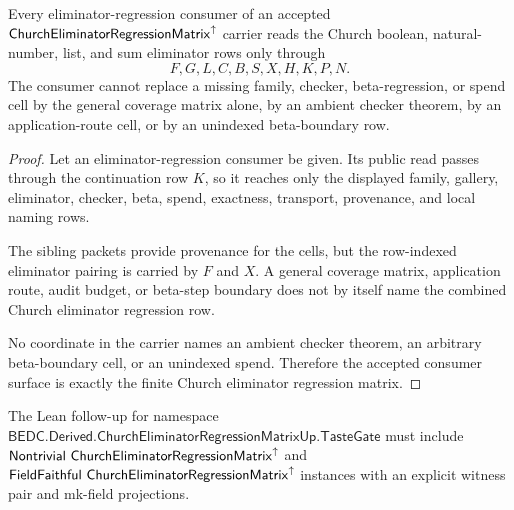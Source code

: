 \begin{theorem}
\label{thm:church-eliminator-regression-matrix-nonescape}
Every eliminator-regression consumer of an accepted $\mathsf{ChurchEliminatorRegressionMatrix}^{\uparrow}$ carrier reads the Church boolean, natural-number, list, and sum eliminator rows only through
$$
F,G,L,C,B,S,X,H,K,P,N.
$$
The consumer cannot replace a missing family, checker, beta-regression, or spend cell by the general coverage matrix alone, by an ambient checker theorem, by an application-route cell, or by an unindexed beta-boundary row.
\end{theorem}
\begin{proof}
Let an eliminator-regression consumer be given. Its public read passes through the continuation row $K$, so it reaches only the displayed family, gallery, eliminator, checker, beta, spend, exactness, transport, provenance, and local naming rows.

The sibling packets provide provenance for the cells, but the row-indexed eliminator pairing is carried by $F$ and $X$. A general coverage matrix, application route, audit budget, or beta-step boundary does not by itself name the combined Church eliminator regression row.

No coordinate in the carrier names an ambient checker theorem, an arbitrary beta-boundary cell, or an unindexed spend. Therefore the accepted consumer surface is exactly the finite Church eliminator regression matrix.
\end{proof}



The Lean follow-up for namespace $\mathsf{BEDC.Derived.ChurchEliminatorRegressionMatrixUp.TasteGate}$ must include $\mathsf{Nontrivial}\ \ChurchEliminatorRegressionMatrixUp$ and $\mathsf{FieldFaithful}\ \ChurchEliminatorRegressionMatrixUp$ instances with an explicit witness pair and mk-field projections.

